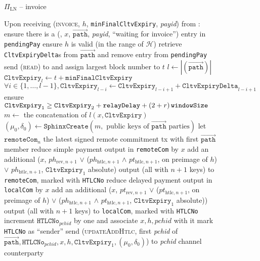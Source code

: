   \begin{figure}[H]
    \begin{protocolbox}{$\Pi_{\mathrm{LN}}$ -- invoice}
      \begin{algorithmic}[1]
        \State Upon receiving (\textsc{invoice}, $h$,
        \texttt{minFinalCltvExpiry}, \textit{payid}) from \bob:
        \Indent
          \State ensure there is a (\bob, $x$, $\overrightarrow{\mathtt{path}}$,
          \textit{payid}, ``waiting for invoice'') entry in \texttt{pendingPay}
          \State ensure $h$ is valid (in the range of $\mathcal{H}$)
          \State retrieve \texttt{CltvExpiryDelta}s from
          $\overrightarrow{\mathtt{path}}$ and remove entry from
          \texttt{pendingPay}
          \State send (\textsc{read}) to \ledger{} and assign largest block
          number to $t$
          \State $l \gets |\left(\overrightarrow{\mathtt{path}}\right)|$
          \State $\mathtt{CltvExpiry}_l \gets t + \mathtt{minFinalCltvExpiry}$
          \State $\forall i \in \{1, \dots, l - 1\}, \mathtt{CltvExpiry}_{l - i}
          \gets \mathtt{CltvExpiry}_{l - i + 1} + \mathtt{CltvExpiryDelta}_{l -
          i + 1}$
          \label{alg:protocol:pay:invoice:cltv}
          \State ensure $\mathtt{CltvExpiry}_1 \geq \mathtt{CltvExpiry}_2 +
          \mathtt{relayDelay} + \left(2 + r\right)\texttt{windowSize}$
          \State $m \gets$ the concatenation of $l \left(x,
          \mathtt{CltvExpiry}\right)$
          \State $\left(\mu_0, \delta_0\right) \gets
          \mathtt{SphinxCreate}\left(m, \text{ public keys of }
          \overrightarrow{\mathtt{path}} \text{ parties}\right)$
          \State let $\mathtt{remoteCom}_n$ the latest signed remote commitment
          tx with first $\overrightarrow{\mathtt{path}}$ member
          \State reduce simple payment output in \texttt{remoteCom} by $x$
          \State add an additional ($x$, $ph_{\mathrm{rev}, n+1}$ $\vee$
          ($ph_{\mathrm{htlc}, n+1}$ $\wedge$ $pt_{\mathrm{htlc}, n+1}$,
          on preimage of $h$) $\vee$
          $ph_{\mathrm{htlc}, n+1}$, $\mathtt{CltvExpiry}_1$ absolute)
          output (all with $n+1$ keys) to \texttt{remoteCom}, marked with
          \texttt{HTLCNo}
          \State reduce delayed payment output in \texttt{localCom} by $x$
          \State add an additional ($x$, $pt_{\mathrm{rev}, n+1}$ $\vee$
          ($pt_{\mathrm{htlc}, n+1}$, on preimage of $h$) $\vee$
          ($ph_{\mathrm{htlc}, n+1}$ $\wedge$ $pt_{\mathrm{htlc}, n+1}$,
          $\mathtt{CltvExpiry}_1$ absolute)) output (all with $n+1$ keys) to
          \texttt{localCom}, marked with \texttt{HTLCNo}
          \State increment $\mathtt{HTLCNo}_{\mathit{pchid}}$ by one and
          associate $x, h, \mathit{pchid}$ with it
          \State mark \texttt{HTLCNo} as ``sender''
          \State send (\textsc{updateAddHtlc}, first \textit{pchid} of
          $\overrightarrow{\mathtt{path}}, \mathtt{HTLCNo}_{\mathit{pchid}}, x,
          h, \mathtt{CltvExpiry}_1, \left(\mu_0, \delta_0\right)$) to
          \textit{pchid} channel counterparty
        \EndIndent
      \end{algorithmic}
    \end{protocolbox}
    \caption{}
    \label{alg:protocol:pay:invoice}
  \end{figure}

